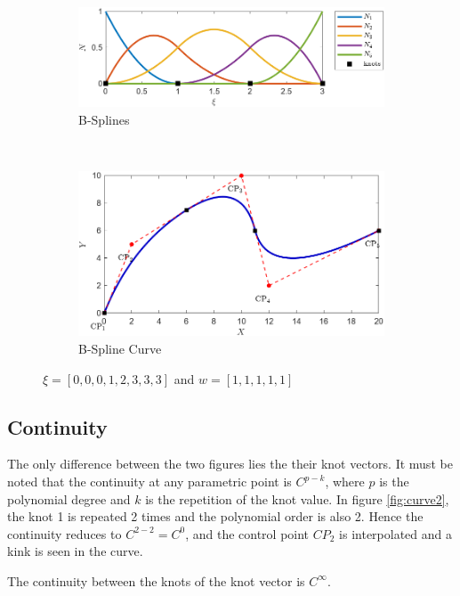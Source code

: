 \documentclass[12pt, a4paper]{report}
\begin{document}
\begin{figure}[htbp]
\centering
\begin{subfigure}{0.8\textwidth}
  \centering
  \includegraphics[width=0.8\linewidth]{Images/NURBS_1.jpg}
  \caption{B-Splines }
\end{subfigure}\\[1ex] %
\begin{subfigure}{0.8\textwidth}
  \centering
  \includegraphics[width=0.8\linewidth]{Images/nCurve_1.png}
  \caption{B-Spline Curve}
\end{subfigure}
\caption{ $\xi=[0, 0, 0, 1, 2, 3, 3, 3]$ and $w=[1,1,1,1,1]$ }
\label{fig:curve1}
\end{figure}
\subsection{Continuity} \label{sec:continuity}
The only difference between the two figures lies the their knot vectors. It must be noted that the continuity at any parametric point is $C^{p-k}$, where $p$ is the polynomial degree and $k$ is the repetition of the knot value. In figure \ref{fig:curve2}, the knot 1 is repeated 2 times and the polynomial order is also 2. Hence the continuity reduces to $C^{2-2}=C^0$, and  the control point $CP_2$ is interpolated and a kink is seen in the curve.
\par 
The continuity between the knots of the knot vector is $C^{\infty}$.
\end{document}
